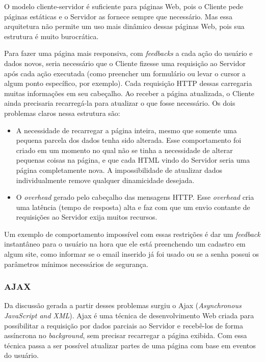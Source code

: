 \documentclass[a4paper,12pt]{article}
\begin{document}
O modelo cliente-servidor é suficiente para páginas Web, pois o Cliente pede páginas estáticas e o Servidor as fornece sempre que necessário. Mas essa arquitetura não permite um uso mais dinâmico dessas páginas Web, pois sua estrutura é muito burocrática.

Para fazer uma página mais responsiva, com \emph{feedbacks} a cada ação do usuário e dados novos, seria necessário que o Cliente fizesse uma requisição ao Servidor após cada ação executada (como preencher um formulário ou levar o cursor a algum ponto específico, por exemplo). Cada requisição HTTP dessas carregaria muitas informações em seu cabeçalho. Ao receber a página atualizada, o Cliente ainda precisaria recarregá-la para atualizar o que fosse necessário. Os dois problemas claros nessa estrutura são:

\begin{itemize}
    \item A necessidade de recarregar a página inteira, mesmo que somente uma pequena parcela dos dados tenha sido alterada. Esse comportamento foi criado em um momento no qual não se tinha a necessidade de alterar pequenas coisas na página, e que cada HTML vindo do Servidor seria uma página completamente nova. A impossibilidade de atualizar dados individualmente remove qualquer dinamicidade desejada.

    \item O \emph{overhead} gerado pelo cabeçalho das mensagens HTTP. Esse \emph{overhead} cria uma latência (tempo de resposta) alta e faz com que um envio contante de requisições ao Servidor exija muitos recursos.
\end{itemize}

Um exemplo de comportamento impossível com essas restrições é dar um \emph{feedback} instantâneo para o usuário na hora que ele está preenchendo um cadastro em algum site, como informar se o email inserido já foi usado ou se a senha possui os parâmetros mínimos necessários de segurança.

\subsubsection{AJAX}

Da discussão gerada a partir desses problemas surgiu o Ajax (\emph{Asynchronous JavaScript and XML}). Ajax é uma técnica de desenvolvimento Web criada para possibilitar a requisição por dados parciais ao Servidor e recebê-los de forma assíncrona no \emph{background}, sem precisar recarregar a página exibida. Com essa técnica passa a ser possível atualizar partes de uma página com base em eventos do usuário.
\end{document}
